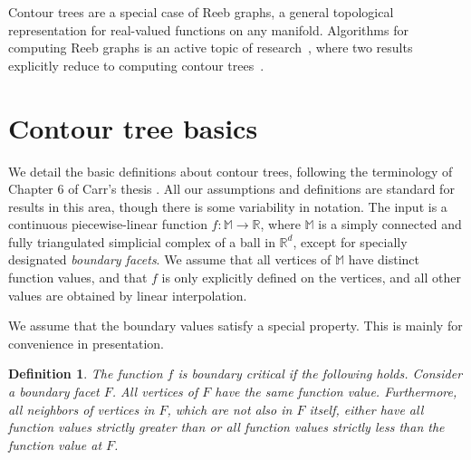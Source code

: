 \documentclass[11pt]{article}
\newtheorem{definition}[theorem]{Definition}
\theoremstyle{definition}
\newcommand{\MM}{\mathbb{M}}
\newcommand{\RR}{\mathbb{R}}
\newcommand{\Sec}[1]{\hyperref[sec:#1]{\S\ref*{sec:#1}}} %
\begin{document}
Contour trees are a special case of Reeb graphs, a general topological representation for real-valued functions
on any manifold. Algorithms for computing Reeb graphs
is an active topic of research~\cite{sk-crgacs-91,cehnp-lrbm-03,PaScBr07,DoNa09,HaWaWe10,Pa12}, where
two results explicitly reduce to computing contour trees~\cite{TiGySi09,DoNa13}.



\section{Contour tree basics} \label{sec:basics}

We detail the basic definitions about contour trees, following the terminology of Chapter 6 of Carr's thesis \cite{c-tmi-04}.
All our assumptions and definitions
are standard for results in this area, though there is some variability in notation.
The input is a continuous piecewise-linear function $f:\MM \to \RR$, where $\MM$ is a simply connected and fully triangulated simplicial complex of a ball in $\RR^d$,
except for specially designated \emph{boundary facets}. We assume that all vertices of $\MM$ have distinct function values, 
and that $f$ is only explicitly defined on the vertices, and all other values are obtained by linear interpolation. 

We assume that the boundary values satisfy a special property. This is mainly for convenience
in presentation.

\begin{definition} \label{def:bound} The function $f$ is \emph{boundary critical} if the following holds.
Consider a boundary facet $F$. All vertices of $F$ have the same function value. Furthermore, all
neighbors of vertices in $F$, which are not also in $F$ itself, 
either have all function values strictly greater than or all function values strictly less than the function value at $F$.
\end{definition}
\end{document}
